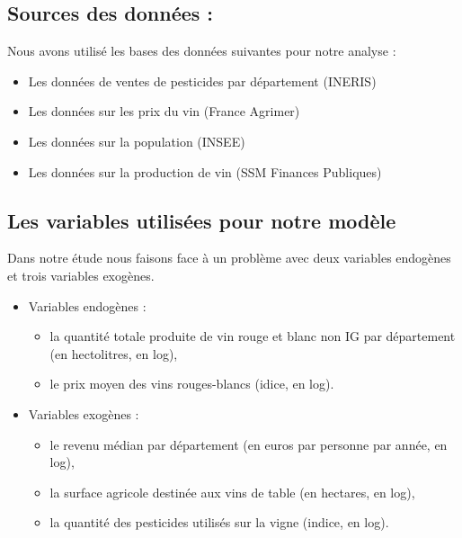 \documentclass[11pt,]{article}
\providecommand{\tightlist}{%
  \setlength{\itemsep}{0pt}\setlength{\parskip}{0pt}}
\begin{document}
\hypertarget{sources-des-donnees}{%
\subsection{Sources des données :}\label{sources-des-donnees}}

Nous avons utilisé les bases des données suivantes pour notre analyse :

\begin{itemize}
    \item Les données de ventes de pesticides par département  (INERIS)
    \item Les données sur les prix du vin (France Agrimer)
    \item Les données sur la population (INSEE)
    \item Les données sur la production de vin (SSM Finances Publiques)
\end{itemize}
\par

\hypertarget{les-variables-utilisees-pour-notre-modele}{%
\subsection{Les variables utilisées pour notre
modèle}\label{les-variables-utilisees-pour-notre-modele}}

Dans notre étude nous faisons face à un problème avec deux variables
endogènes et trois variables exogènes.

\begin{itemize}
\tightlist
\item
  Variables endogènes :

  \begin{itemize}
  \tightlist
  \item
    la quantité totale produite de vin rouge et blanc non IG par
    département (en hectolitres, en log),
  \item
    le prix moyen des vins rouges-blancs (idice, en log).
  \end{itemize}
\item
  Variables exogènes :

  \begin{itemize}
  \tightlist
  \item
    le revenu médian par département (en euros par personne par année,
    en log),
  \item
    la surface agricole destinée aux vins de table (en hectares, en
    log),
  \item
    la quantité des pesticides utilisés sur la vigne (indice, en log).
  \end{itemize}
\end{itemize}
\end{document}
